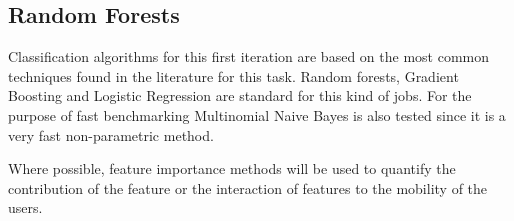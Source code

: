 
\subsection{Random Forests}

Classification algorithms for this first iteration are based on the most common techniques found in the literature for this task. Random forests, Gradient Boosting and Logistic Regression are standard for this kind of jobs. For the purpose of fast benchmarking Multinomial Naive Bayes is also tested since it is a very fast non-parametric method. 

Where possible, feature importance methods will be used to quantify the contribution of the feature or the interaction of features to the mobility of the users.

